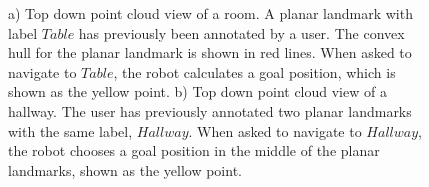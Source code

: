 \documentclass[3p]{elsarticle}
\begin{document}
\begin{figure}[ht!]
\centering
%
\caption{a) Top down point cloud view of a room. A planar landmark with label $Table$ has previously been annotated by a user. The convex hull for the planar landmark is shown in red lines. When asked to navigate to $Table$, the robot calculates a goal position, which is shown as the yellow point. b) Top down point cloud view of a hallway. The user has previously annotated two planar landmarks with the same label, $Hallway$. When asked to navigate to $Hallway$, the robot chooses a goal position in the middle of the planar landmarks, shown as the yellow point.}
\label{fig:navigation_plane_examples}
\end{figure}
\end{document}
